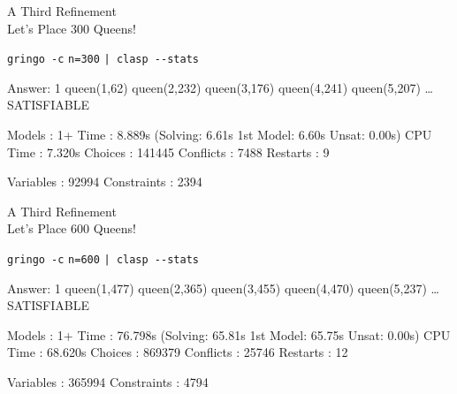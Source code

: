 \begin{frame}[fragile]{A Third Refinement\\
              \normalsize Let's Place \alert{$300$} Queens!}
\begin{block}{\alert<1>{\lstinline{gringo -c} \alert{\lstinline{n=300}}  \lstinline{| clasp --stats}}}
\vspace*{-3mm}
\pause\footnotesize%
\begin{semiverbatim}
Answer: 1
queen(1,62) queen(2,232) queen(3,176) queen(4,241) queen(5,207) \dots{}
SATISFIABLE

Models      : 1+
\alert<2-3>{Time        : 8.889s} (\alert<3>{Solving: 6.61s} 1st Model: 6.60s Unsat: 0.00s)
CPU Time    : 7.320s
Choices     : 141445
\alert<2>{Conflicts   : 7488}
Restarts    : 9

\alert<2>{Variables   : 92994}
\alert<2>{Constraints : 2394}
\end{semiverbatim}
\end{block}
\end{frame}
\begin{frame}[fragile]{A Third Refinement\\
              \normalsize Let's Place \alert{$600$} Queens!}
\begin{block}{\alert<1>{\lstinline{gringo -c} \alert{\lstinline{n=600}}  \lstinline{| clasp --stats}}}
\vspace*{-3mm}
\pause\footnotesize%
\begin{semiverbatim}
Answer: 1
queen(1,477) queen(2,365) queen(3,455) queen(4,470) queen(5,237) \dots{}
SATISFIABLE

Models      : 1+
\alert<2>{Time        : 76.798s} (\alert<2>{Solving: 65.81s} 1st Model: 65.75s Unsat: 0.00s)
CPU Time    : 68.620s
Choices     : 869379
\alert<2>{Conflicts   : 25746}
Restarts    : 12

\alert<2>{Variables   : 365994}
\alert<2>{Constraints : 4794}
\end{semiverbatim}
\end{block}
\end{frame}
